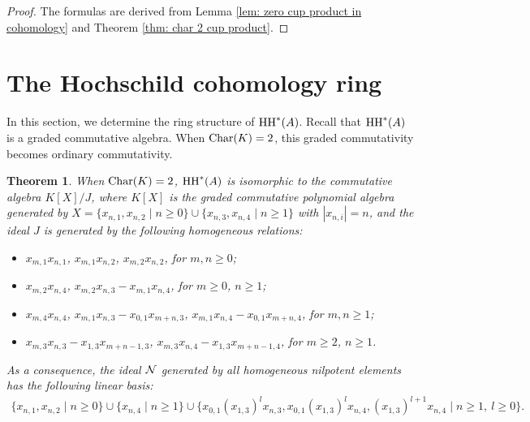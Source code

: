 \documentclass[10pt, reqno]{amsart}
\newtheorem{theorem}{Theorem}[section]
\theoremstyle{definition}
\theoremstyle{remark}
\numberwithin{equation}{section}
\begin{document}
\begin{proof}
The formulas are derived from Lemma \ref{lem: zero cup product in cohomology} and Theorem \ref{thm: char 2 cup product}.
\end{proof}



\section{The Hochschild cohomology ring}\label{sec: The Hochschild cohomology ring}
In this section, we determine the ring structure of \(\mathrm{HH}^*(A)\). Recall that \(\mathrm{HH}^*(A)\) is a graded commutative algebra. When \(\mathrm{Char}(K)=2\), this graded commutativity becomes ordinary commutativity. %
\begin{theorem}\label{thm: char 2 ring}
    When \(\mathrm{Char}(K)=2\), \(\mathrm{HH}^*(A)\) is isomorphic to the commutative algebra \(K[X]/J\), where \(K[X]\) is the  graded commutative polynomial algebra generated by \( X = \{x_{n,1}, x_{n,2} \mid n \ge 0\} \cup \{x_{n,3}, x_{n,4} \mid n \ge 1\}\) with \(|x_{n,i}| = n\), and  
the ideal \(J\) is generated by the following homogeneous relations:
\begin{itemize}
     \item \(x_{m,1} x_{n,1}\), \(x_{m,1} x_{n,2}\), \(x_{m,2} x_{n,2}\), for \(m,n \ge 0\);
    \item \(x_{m,2} x_{n,4}\),  \(x_{m,2}x_{n,3}-x_{m,1}x_{n,4} \),  for \(m \ge 0\), \(n \ge 1\);
    \item  \(x_{m,4} x_{n,4}\), \(x_{m,1} x_{n,3}- x_{0,1} x_{m+n,3}\),  \(x_{m,1} x_{n,4} - x_{0,1} x_{m+n,4} \), for \(m,n \ge 1\);
    \item  \( x_{m,3} x_{n,3}- x_{1,3} x_{m+n-1,3} \), \(x_{m,3} x_{n,4} - x_{1,3} x_{m+n-1,4} \),
    for \( m\ge 2\), \( n \ge 1\).
\end{itemize}

As a consequence,    the ideal   $\mathcal{N}$ generated by all homogeneous nilpotent elements has the following linear basis: 
$$\begin{aligned}
    \{x_{n,1}, x_{n,2} \mid n\ge 0\}\cup \{x_{n,4} \mid n\ge 1\}
    \cup\{x_{0,1}(x_{1,3})^l x_{n,3}, x_{0,1}(x_{1,3})^l x_{n,4}, (x_{1,3})^{l+1} x_{n,4} \mid n \ge 1,\ l \ge 0\}.
\end{aligned}$$
 

\end{theorem}
\end{document}
